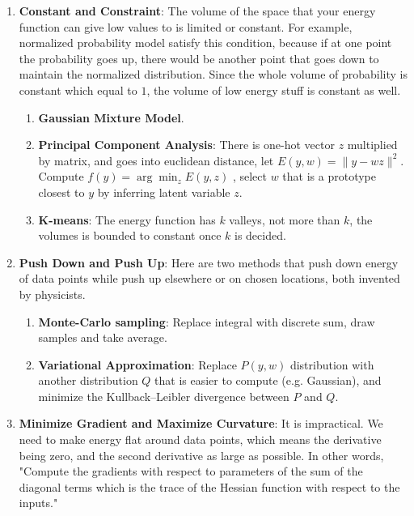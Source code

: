 \begin{enumerate}
    \item \textbf{Constant and Constraint}: The volume of the space that your energy function can give low values to is limited or constant. For example, normalized probability model satisfy this condition, because if at one point the probability goes up, there would be another point that goes down to maintain the normalized distribution. Since the whole volume of probability is constant which equal to $1$, the volume of low energy stuff is constant as well.
    \begin{enumerate}
        \item \textbf{Gaussian Mixture Model}.
        \item \textbf{Principal Component Analysis}: There is one-hot vector $z$ multiplied by matrix, and goes into euclidean distance, let $E(y, w)= \|y-wz \|^2$. Compute $f(y)= \arg\min_z E(y,z)$ , select $w$ that is a prototype closest to $y$ by inferring latent variable $z$.
        \item \textbf{K-means}: The energy function has $k$ valleys, not more than $k$, the volumes is bounded to constant once $k$ is decided.
    \end{enumerate}

    \item \textbf{Push Down and Push Up}: Here are two methods that push down energy of data points while push up elsewhere or on chosen locations, both invented by physicists.
    \begin{enumerate}
        \item \textbf{Monte-Carlo sampling}: Replace integral with discrete sum, draw samples and take average.
        \item \textbf{Variational Approximation}: Replace $P(y, w)$ distribution with another distribution $Q$ that is easier to compute (e.g. Gaussian), and minimize the Kullback–Leibler divergence between $P$ and $Q$.
    \end{enumerate}

    \item \textbf{Minimize Gradient and Maximize Curvature}: It is impractical. We need to make energy flat around data points, which means the derivative being zero, and the second derivative as large as possible. In other words, "Compute the gradients with respect to parameters of the sum of the diagonal terms which is the trace of the Hessian function with respect to the inputs."


\end{enumerate}

